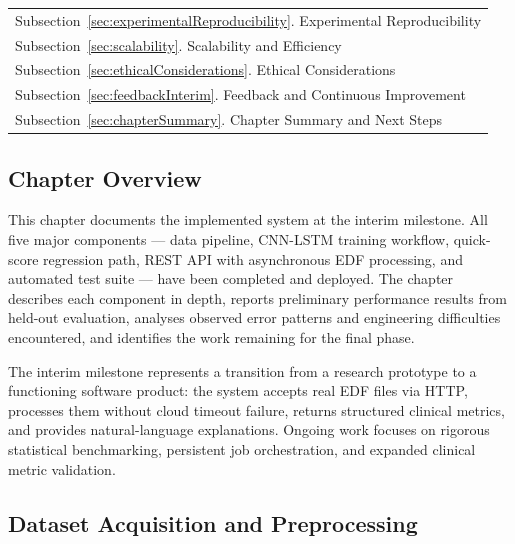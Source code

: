 \documentclass[10pt]{article}
\begin{document}
\begin{margintable}
\begin{tabularx}{\marginparwidth}{|X}
  Subsection~\ref{sec:experimentalReproducibility}. Experimental Reproducibility\\
  Subsection~\ref{sec:scalability}. Scalability and Efficiency\\
  Subsection~\ref{sec:ethicalConsiderations}. Ethical Considerations\\
  Subsection~\ref{sec:feedbackInterim}. Feedback and Continuous Improvement\\
  Subsection~\ref{sec:chapterSummary}. Chapter Summary and Next Steps\\
\end{tabularx}
\end{margintable}

\subsection{Chapter Overview}
\label{sec:chapterOverview}

This chapter documents the implemented system at the interim milestone. All five major components --- data pipeline, CNN-LSTM training workflow, quick-score regression path, REST API with asynchronous EDF processing, and automated test suite --- have been completed and deployed. The chapter describes each component in depth, reports preliminary performance results from held-out evaluation, analyses observed error patterns and engineering difficulties encountered, and identifies the work remaining for the final phase.

The interim milestone represents a transition from a research prototype to a functioning software product: the system accepts real EDF files via HTTP, processes them without cloud timeout failure, returns structured clinical metrics, and provides natural-language explanations. Ongoing work focuses on rigorous statistical benchmarking, persistent job orchestration, and expanded clinical metric validation.

\subsection{Dataset Acquisition and Preprocessing}
\label{sec:datasetAcquisition}

\end{document}
